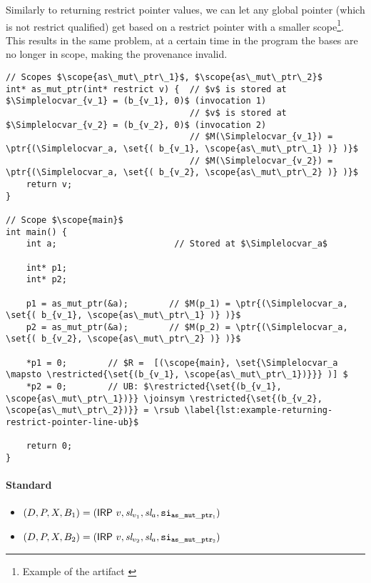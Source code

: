 Similarly to returning restrict pointer values, we can let any global pointer (which is not restrict qualified) get based on a restrict pointer with a smaller scope\footnote{Example  of the artifact \cite{klappe_2024_11031862}}.
This results in the same problem, \ie at a certain time in the program the bases are no longer in scope, making the provenance invalid. 

\begin{code}
\begin{verbatim}
// Scopes $\scope{as\_mut\_ptr\_1}$, $\scope{as\_mut\_ptr\_2}$
int* as_mut_ptr(int* restrict v) {  // $v$ is stored at $\Simplelocvar_{v_1} = (b_{v_1}, 0)$ (invocation 1)
                                    // $v$ is stored at $\Simplelocvar_{v_2} = (b_{v_2}, 0)$ (invocation 2)
                                    // $M(\Simplelocvar_{v_1}) = \ptr{(\Simplelocvar_a, \set{( b_{v_1}, \scope{as\_mut\_ptr\_1} )} )}$
                                    // $M(\Simplelocvar_{v_2}) = \ptr{(\Simplelocvar_a, \set{( b_{v_2}, \scope{as\_mut\_ptr\_2} )} )}$
    return v;
}

// Scope $\scope{main}$
int main() {
    int a;                       // Stored at $\Simplelocvar_a$

    int* p1;
    int* p2;

    p1 = as_mut_ptr(&a);        // $M(p_1) = \ptr{(\Simplelocvar_a, \set{( b_{v_1}, \scope{as\_mut\_ptr\_1} )} )}$
    p2 = as_mut_ptr(&a);        // $M(p_2) = \ptr{(\Simplelocvar_a, \set{( b_{v_2}, \scope{as\_mut\_ptr\_2} )} )}$

    *p1 = 0;        // $R =  [(\scope{main}, \set{\Simplelocvar_a \mapsto \restricted{\set{(b_{v_1}, \scope{as\_mut\_ptr\_1})}}} )] $
    *p2 = 0;        // UB: $\restricted{\set{(b_{v_1}, \scope{as\_mut\_ptr\_1})}} \joinsym \restricted{\set{(b_{v_2}, \scope{as\_mut\_ptr\_2})}} = \rsub \label{lst:example-returning-restrict-pointer-line-ub}$

    return 0;
}
\end{verbatim}
\caption{Returning a restrict pointer (TMU)}
\label{lst:example-returning-restrict-pointer}
\end{code}

\paragraph{Standard}

\begin{itemize}
    \itemsep0em
    \item $(D, P, X, B_1) = (\mathsf{IRP} \ v, \textit{sl}_{v_1}, \textit{sl}_a, \mathtt{si}_\mathtt{as\_mut\_ptr_1})$
    \item $(D, P, X, B_2) = (\mathsf{IRP} \ v, \textit{sl}_{v_2}, \textit{sl}_a, \mathtt{si}_\mathtt{as\_mut\_ptr_2})$
\end{itemize}

